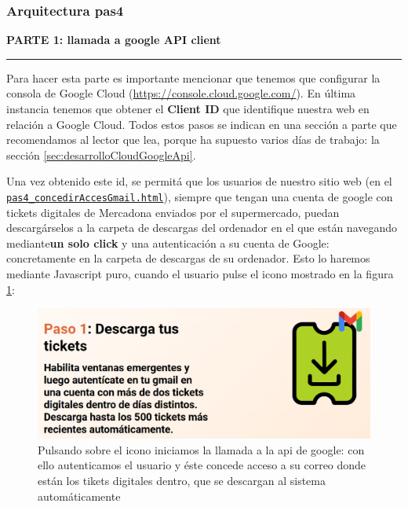 \documentclass[a4paper,12pt]{report}
\begin{document}
	\subsubsection{Arquitectura pas4}
	\label{sec:pas4googleAPIclient}
	
	
	
		
	\noindent \textbf{PARTE 1: llamada a google API client}
	\hrule
	\vspace{.5em}
	
	Para hacer esta parte es importante mencionar que tenemos que configurar la consola de Google Cloud (\href{https://console.cloud.google.com/}{https://console.cloud.google.com/}). En última instancia tenemos que obtener el \textbf{Client ID} que identifique nuestra web en relación a Google Cloud. Todos estos pasos se indican en una sección a parte que recomendamos al lector que lea, porque ha supuesto varios días de trabajo: la sección \ref{sec:desarrolloCloudGoogleApi}.
	
	Una vez obtenido este id, se permitá que los usuarios de nuestro sitio web (en el \href{https://github.com/blackcub3s/mercApp/blob/main/APP%20WEB/__frontend__produccio__/app/pas4_concedirAccesGmail.html}{\texttt{pas4\_concedirAccesGmail.html}}), siempre que tengan una cuenta de google con tickets digitales de Mercadona enviados por el supermercado, puedan descargárselos a la carpeta de descargas del ordenador en el que están navegando mediante\textbf{un solo click} y una autenticación a su cuenta de Google: concretamente en la carpeta de descargas de su ordenador. Esto lo haremos mediante Javascript puro, cuando el usuario pulse el icono mostrado en la figura \ref{fig:pujarticketspas4}:
	
	\begin{figure}[H]
		\centering
		\caption{Pulsando sobre el icono iniciamos la llamada a la api de google: con ello autenticamos el usuario y éste concede acceso a su correo donde están los tikets digitales dentro, que se descargan al sistema automáticamente}
		\includegraphics[width=1\linewidth]{img/pujarTicketsPas4}

		\label{fig:pujarticketspas4}
	\end{figure}
	
\end{document}
